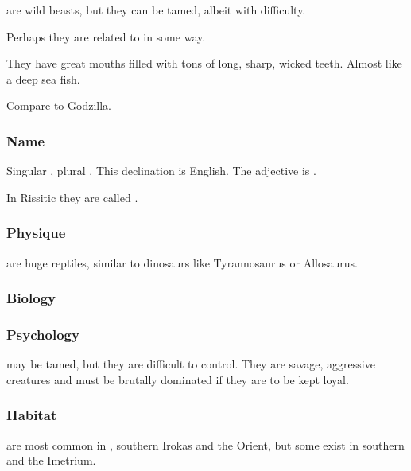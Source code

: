 \Cortios{} are wild beasts, but they can be tamed, albeit with difficulty. 

Perhaps they are related to \dragons{} in some way. 

They have great mouths filled with tons of long, sharp, wicked teeth. Almost like a deep sea fish. 

Compare to Godzilla. 









\subsubsection{Name}
Singular \emph{\cortio{}}, plural \emph{\cortios{}}. 
This declination is English. 
The adjective is \emph{\cortio{}}. 

In Rissitic they are called \emph{\tashrek{}}. 









\subsubsection{Physique}
\Cortios{} are huge reptiles, similar to dinosaurs like Tyrannosaurus or Allosaurus. 









\subsubsection{Biology}








\subsubsection{Psychology}
\Cortios{} may be tamed, but they are difficult to control. They are savage, aggressive creatures and must be brutally dominated if they are to be kept loyal. 









\subsubsection{Habitat}
\Cortios{} are most common in \Durcac, southern Irokas and the Orient, but some exist in southern \Velcad{} and the Imetrium. 















